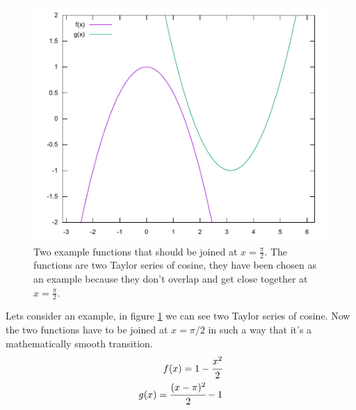 \documentclass[11pt,DIV=10,final]{scrreprt} %
\begin{document}
\begin{figure}[h]
  \centering
  \includegraphics[width=.9\textwidth]{plots/cos_taylor.pdf}
  \caption{Two example functions that should be joined at $x=\frac{\pi}{2}$. The functions are two Taylor series of cosine, they have been chosen as an example because they don't overlap and get
  close together at $x = \frac{\pi}{2}.$}\label{fig:cos_taylor}
\end{figure}

Lets consider an example, in figure \ref{fig:cos_taylor} we can see two Taylor series of cosine. Now the two functions have to be joined at $x = \pi / 2$ in such a way that it's a mathematically smooth transition.
\begin{align}
  \label{joint:f}
  f(x) = 1 - \cfrac{x^{2}}{2} \\
  \label{joint:g}
  g(x) = \cfrac{(x - \pi)^{2}}{2} -  1
\end{align}
\end{document}
